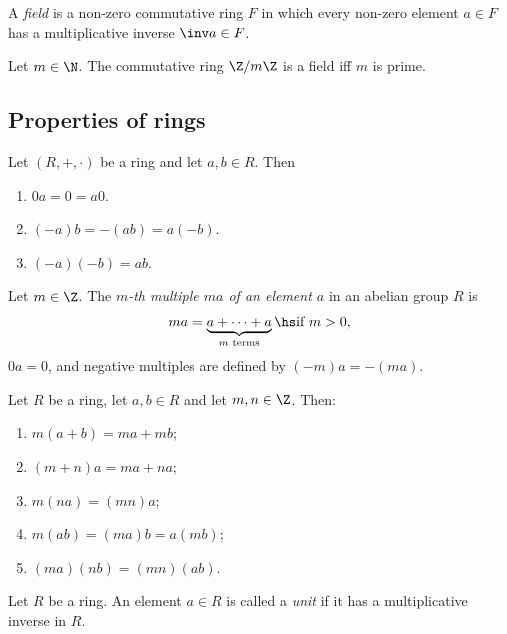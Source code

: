 \documentclass{article}
\begin{document}
\begin{definition}
    A \emph{field} is a non-zero commutative ring $F$ in which every non-zero element 
    $a\in F$ has a multiplicative inverse $\inv a\in F$.
\end{definition}

\begin{proposition}[Notes 3.1.11]
    Let $m\in\N$. The commutative ring $\Z/m\Z$ is a field iff $m$ is prime.
\end{proposition}

\subsection{Properties of rings}

\begin{lemma}[Notes 3.2.1]
    Let $(R,+,\cdot)$ be a ring and let $a,b\in R$. Then 
    \begin{enumerate}
        \item $0a=0=a0$.
        \item $(-a)b=-(ab)=a(-b)$.
        \item $(-a)(-b) = ab$.
    \end{enumerate} 
\end{lemma}

\begin{definition}
    Let $m\in\Z$. The \emph{$m$-th multiple $ma$ of an element $a$} in an abelian 
    group $R$ is 
    \begin{align*}
        ma = \underbrace{a + \cdots + a}_\text{$m$ terms} \hs \text{if } m >0,
    \end{align*}
    $0a=0$, and negative multiples are defined by $(-m)a=-(ma)$.
\end{definition}

\begin{lemma}[Notes 3.2.4]
    Let $R$ be a ring, let $a,b\in R$ and let $m,n\in\Z$. Then:
    \begin{enumerate}
        \item $m(a+b)=ma+mb$;
        \item $(m+n)a=ma+na$;
        \item $m(na)=(mn)a$;
        \item $m(ab)=(ma)b=a(mb)$;
        \item $(ma)(nb)=(mn)(ab)$.
    \end{enumerate} 
\end{lemma}

\begin{definition}
    Let $R$ be a ring. An element $a\in R$ is called a \emph{unit} if it has a 
    multiplicative inverse in $R$.
\end{definition}
\end{document}
